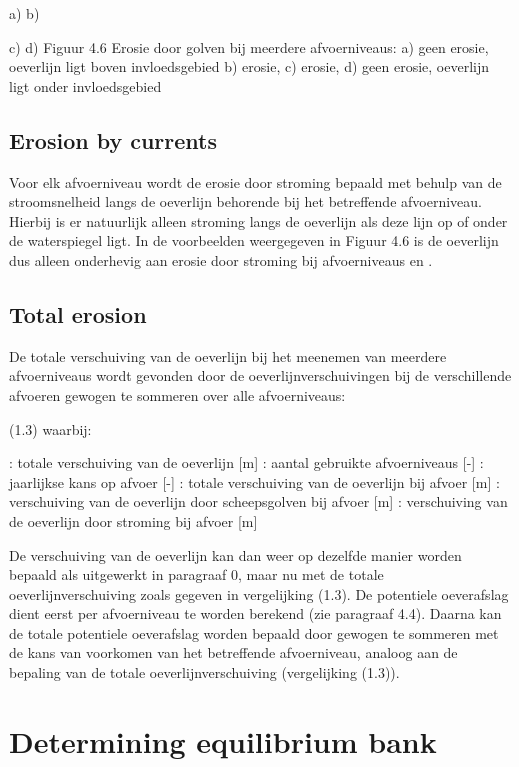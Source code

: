 a)	
b)

c)	
d)
Figuur 4.6 Erosie door golven bij meerdere afvoerniveaus: a) geen erosie, oeverlijn ligt boven invloedsgebied b) erosie, c) erosie, d) geen erosie, oeverlijn ligt onder invloedsgebied

\subsection{Erosion by currents}

Voor elk afvoerniveau wordt de erosie door stroming bepaald met behulp van de stroomsnelheid langs de oeverlijn behorende bij het betreffende afvoerniveau.
Hierbij is er natuurlijk alleen stroming langs de oeverlijn als deze lijn op of onder de waterspiegel ligt.
In de voorbeelden weergegeven in Figuur 4.6 is de oeverlijn dus alleen onderhevig aan erosie door stroming bij afvoerniveaus   en  .

\subsection{Total erosion}

De totale verschuiving van de oeverlijn bij het meenemen van meerdere afvoerniveaus wordt gevonden door de oeverlijnverschuivingen bij de verschillende afvoeren gewogen te sommeren over alle afvoerniveaus:

	 	(1.3)
waarbij:

  		: totale verschuiving van de oeverlijn [m]
 		: aantal gebruikte afvoerniveaus [-]
 		: jaarlijkse kans op afvoer   [-]
 	: totale verschuiving van de oeverlijn bij afvoer   [m]
 	: verschuiving van de oeverlijn door scheepsgolven bij afvoer   [m]
 	: verschuiving van de oeverlijn door stroming bij afvoer   [m]

De verschuiving van de oeverlijn kan dan weer op dezelfde manier worden bepaald als uitgewerkt in paragraaf 0, maar nu met de totale oeverlijnverschuiving zoals gegeven in vergelijking (1.3).
De potentiele oeverafslag dient eerst per afvoerniveau te worden berekend (zie paragraaf 4.4).
Daarna kan de totale potentiele oeverafslag worden bepaald door gewogen te sommeren met de kans van voorkomen van het betreffende afvoerniveau, analoog aan de bepaling van de totale oeverlijnverschuiving (vergelijking (1.3)).

\section{Determining equilibrium bank}

